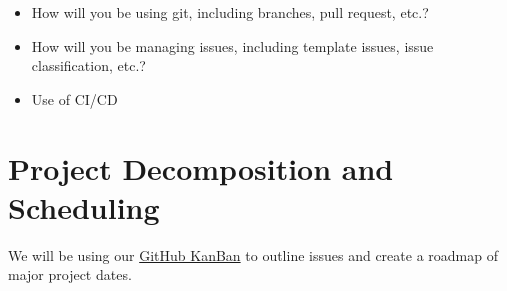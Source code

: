 \documentclass{article}
\begin{document}
\begin{itemize}
	\item How will you be using git, including branches, pull request, etc.?
	\item How will you be managing issues, including template issues, issue
	classification, etc.?
  \item Use of CI/CD
\end{itemize}

\section{Project Decomposition and Scheduling}
We will be using our \href{https://github.com/users/JackEaston4/projects/3/views/2}{GitHub KanBan} to outline issues and create a roadmap of major project dates.
\\
\end{document}
